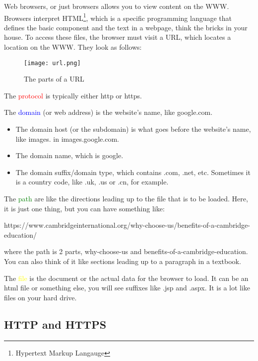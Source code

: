 \documentclass[../main.tex]{subfiles}
\begin{document}
Web browsers, or just browsers allows you to view content on the WWW. Browsers interpret HTML\footnote{Hypertext Markup Langauge}, which is a specific programming language that defines the basic component and the text in a webpage, think the bricks in your house. To access these files, the browser must visit a URL, which locates a location on the WWW. They look as follows:

\begin{figure}[H]
    \centering
    \texttt{[image: url.png]}
    \caption{The parts of a URL}
    \label{fig:url}
\end{figure}

The \textcolor{red}{protocol} is typically either {\mono http} or {\mono https}.

The \textcolor{blue}{domain} (or web address) is the website's name, like {\mono google.com}. 
\begin{itemize}
    \item The domain host (or the subdomain) is what goes before the website's name, like {\mono images.} in {\mono images.google.com}.
    \item The domain name, which is {\mono google}.
    \item The domain suffix/domain type, which contains {\mono .com}, {\mono .net}, etc. Sometimes it is a country code, like {\mono .uk}, {\mono .us} or {\mono .cn}, for example.
\end{itemize}

The \textcolor{green}{path} are like the directions leading up to the file that is to be loaded. Here, it is just one thing, but you can have something like:

{\mono https://www.cambridgeinternational.org/why-choose-us/benefits-of-a-cambridge-education/}

where the path is 2 parts, {\mono why-choose-us} and {\mono benefits-of-a-cambridge-education}. You can also think of it like sections leading up to a paragraph in a textbook. 

The \textcolor{yellow}{file} is the document or the actual data for the browser to load. It can be an html file or something else, you will see suffixes like {\mono .jsp} and {\mono .aspx}. It is a lot like files on your hard drive.

\subsection{HTTP and HTTPS}
\end{document}
